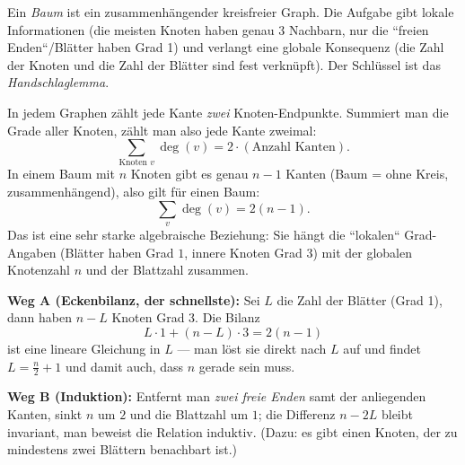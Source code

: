 


Ein \emph{Baum} ist ein zusammenhängender kreisfreier Graph. Die Aufgabe
gibt lokale Informationen (die meisten Knoten haben genau 3 Nachbarn,
nur die ``freien Enden``/Blätter haben Grad 1) und verlangt eine globale
Konsequenz (die Zahl der Knoten und die Zahl der Blätter sind fest
verknüpft). Der Schlüssel ist das \emph{Handschlaglemma}.

\begin{werkzeugkasten}
In jedem Graphen zählt jede Kante \emph{zwei} Knoten-Endpunkte. Summiert
man die Grade aller Knoten, zählt man also jede Kante zweimal:
\begin{equation}
  \sum_{\text{Knoten }v}\deg(v)=2\cdot(\text{Anzahl Kanten}).
\end{equation}
In einem Baum mit $n$ Knoten gibt es genau $n-1$ Kanten (Baum = ohne
Kreis, zusammenhängend), also gilt für einen Baum:
\begin{equation}
  \sum_v \deg(v)=2(n-1).
\end{equation}
Das ist eine sehr starke algebraische Beziehung: Sie hängt die ``lokalen``
Grad-Angaben (Blätter haben Grad $1$, innere Knoten Grad $3$) mit der
globalen Knotenzahl $n$ und der Blattzahl zusammen.
\end{werkzeugkasten}

\begin{werkzeugkasten}
\textbf{Weg A (Eckenbilanz, der schnellste):} Sei $L$ die Zahl der
Blätter (Grad 1), dann haben $n-L$ Knoten Grad 3. Die Bilanz
\begin{equation}
  L\cdot1+(n-L)\cdot3=2(n-1)
\end{equation}
ist eine lineare Gleichung in $L$ --- man löst sie direkt nach $L$ auf
und findet $L=\tfrac n2+1$ und damit auch, dass $n$ gerade sein muss.

\textbf{Weg B (Induktion):} Entfernt man \emph{zwei freie Enden} samt
der anliegenden Kanten, sinkt $n$ um $2$ und die Blattzahl um $1$;
die Differenz $n-2L$ bleibt invariant, man beweist die Relation
induktiv. (Dazu: es gibt einen Knoten, der zu mindestens zwei Blättern
benachbart ist.)
\end{werkzeugkasten}

